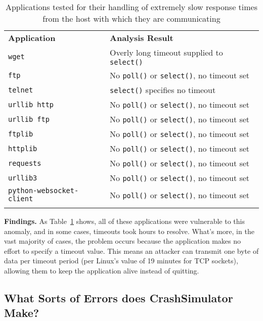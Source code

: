 \begin{table}[t]
  \scriptsize{}
  \begin{tabular}{l | l}
    \toprule{}
    {\bf Application}              & {\bf Analysis Result}\\
    {\tt wget}                     & Overly long timeout supplied to {\tt select()} \\
    {\tt ftp}                      & No {\tt poll()} or {\tt select()}, no timeout set \\
    {\tt telnet}                   & {\tt select()} specifies no timeout \\
    {\tt urllib http}              & No {\tt poll()} or {\tt select()}, no timeout set \\
    {\tt urllib ftp}               & No {\tt poll()} or {\tt select()}, no timeout set \\
    {\tt ftplib}                   & No {\tt poll()} or {\tt select()}, no timeout set \\
    {\tt httplib}                  & No {\tt poll()} or {\tt select()}, no timeout set \\
    {\tt requests}                 & No {\tt poll()} or {\tt select()}, no timeout set \\
    {\tt urllib3}                  & No {\tt poll()} or {\tt select()}, no timeout set \\
    {\tt python-websocket-client}  & No {\tt poll()} or {\tt select()}, no timeout set \\
    \bottomrule{}
  \end{tabular}
  \caption{Applications tested for their handling of extremely slow response
    times from the host with which they are communicating }
  \label{table:slowloris}
\end{table}


{\bf Findings.}
As Table~\ref{table:slowloris} shows, all of these
applications were vulnerable to this anomaly,
and in some cases,
timeouts took hours to resolve.
What's more, in the vast majority of
cases, the problem occurs because the application makes no effort to
specify a timeout value.  This means an attacker can transmit one byte of
data per timeout period (per Linux's value of 19 minutes for TCP sockets),
allowing them to keep the application alive instead of quitting.


\subsection{What Sorts of Errors does CrashSimulator Make?}
\label{sec-sorts-errors}


